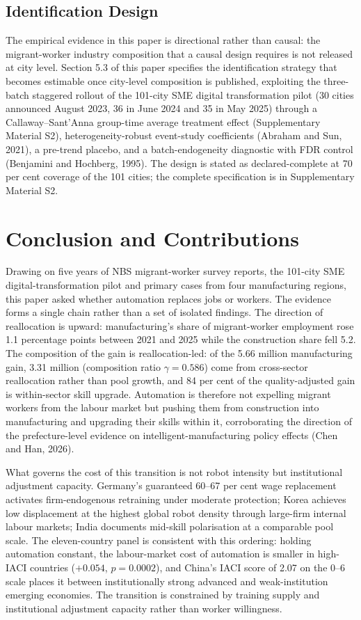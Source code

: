 \documentclass[12pt]{article}
\begin{document}
\subsection{Identification Design}

The empirical evidence in this paper is directional rather than causal: the migrant-worker industry composition that a causal design requires is not released at city level. Section 5.3 of this paper specifies the identification strategy that becomes estimable once city-level composition is published, exploiting the three-batch staggered rollout of the 101-city SME digital transformation pilot (30 cities announced August 2023, 36 in June 2024 and 35 in May 2025) through a Callaway--Sant'Anna group-time average treatment effect (Supplementary Material S2), heterogeneity-robust event-study coefficients (Abraham and Sun, 2021), a pre-trend placebo, and a batch-endogeneity diagnostic with FDR control (Benjamini and Hochberg, 1995). The design is stated as declared-complete at 70 per cent coverage of the 101 cities; the complete specification is in Supplementary Material S2.

\section{Conclusion and Contributions}

Drawing on five years of NBS migrant-worker survey reports, the 101-city SME digital-transformation pilot and primary cases from four manufacturing regions, this paper asked whether automation replaces jobs or workers. The evidence forms a single chain rather than a set of isolated findings. The direction of reallocation is upward: manufacturing's share of migrant-worker employment rose 1.1 percentage points between 2021 and 2025 while the construction share fell 5.2. The composition of the gain is reallocation-led: of the 5.66 million manufacturing gain, 3.31 million (composition ratio $\gamma=0.586$) come from cross-sector reallocation rather than pool growth, and 84 per cent of the quality-adjusted gain is within-sector skill upgrade. Automation is therefore not expelling migrant workers from the labour market but pushing them from construction into manufacturing and upgrading their skills within it, corroborating the direction of the prefecture-level evidence on intelligent-manufacturing policy effects (Chen and Han, 2026).

What governs the cost of this transition is not robot intensity but institutional adjustment capacity. Germany's guaranteed 60--67 per cent wage replacement activates firm-endogenous retraining under moderate protection; Korea achieves low displacement at the highest global robot density through large-firm internal labour markets; India documents mid-skill polarisation at a comparable pool scale. The eleven-country panel is consistent with this ordering: holding automation constant, the labour-market cost of automation is smaller in high-IACI countries ($+0.054$, $p=0.0002$), and China's IACI score of 2.07 on the 0--6 scale places it between institutionally strong advanced and weak-institution emerging economies. The transition is constrained by training supply and institutional adjustment capacity rather than worker willingness.
\end{document}
